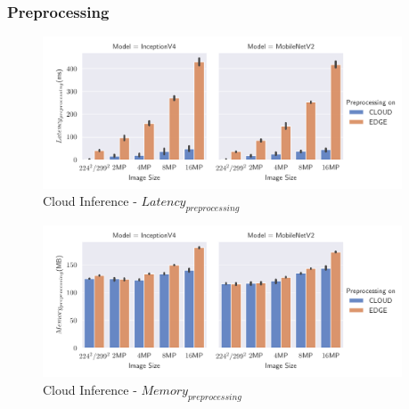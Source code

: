\subsubsection{Preprocessing}
\begin{figure}[H]


\centering
\includegraphics[width=0.95\textwidth]{./Bilder/single_plots/cloud_inference_plots/Cloud_Inference_Preprocessing_Latency.pdf}
\caption{Cloud Inference -  $Latency_{preprocessing}$}
\label{fig:cloudInferencePreproLat}
\end{figure}
\begin{figure}[H]
\centering
\includegraphics[width=0.95\textwidth]{./Bilder/single_plots/cloud_inference_plots/Cloud_Inference_Preprocessing_Memory.pdf}
\caption{Cloud Inference -  $Memory_{preprocessing}$}
\label{fig:cloudInferencePreproMemory}
\end{figure}

